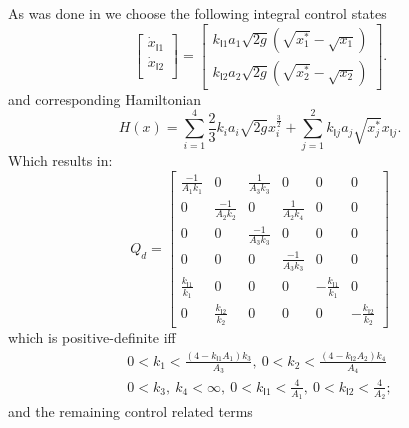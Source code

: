 As was done in \cite{johnsen07:_inter_and_dampin_assig_passiv} we
choose the following integral control states
\begin{equation}
\label{E:four_tank_I}
\begin{bmatrix}
\dot{x}_{\mathsf{I}1}\\
\dot{x}_{\mathsf{I}2}\\
\end{bmatrix} = 
\begin{bmatrix}
k_{\mathsf{I}1} a_1 \sqrt{2 g} \left ( \sqrt{x^*_1} -  \sqrt{x_1}
\right )\\
k_{\mathsf{I}2} a_2 \sqrt{2 g} \left ( \sqrt{x^*_2} -  \sqrt{x_2}
\right )
\end{bmatrix}.
\end{equation}
and corresponding Hamiltonian
\begin{equation}
\label{E:four_tank_ham}
H(x) = \sum_{i=1}^4 \frac{2}{3} k_i a_i \sqrt{2g} x_i^{\frac{3}{2}} +
\sum_{j=1}^2 k_{\mathsf{I}j} a_j \sqrt{x_j^*} x_{\mathsf{I}j}.
\end{equation}
Which results in:
\begin{equation*}
Q_d = \begin{bmatrix}
\frac{-1}{A_1k_1} & 0 & \frac{1}{A_3k_3} & 0 & 0 & 0\\
0 & \frac{-1}{A_2k_2} & 0 & \frac{1}{A_2k_4} & 0 & 0 \\
0 & 0 & \frac{-1}{A_3k_3} & 0  & 0 & 0 \\
0 & 0 & 0 & \frac{-1}{A_3k_3} & 0  & 0 \\
\frac{k_{\mathsf{I}1}}{k_1} & 0 & 0 & 0 & -\frac{k_{\mathsf{I}1}}{k_1}
& 0\\
0 & \frac{k_{\mathsf{I}2}}{k_2} & 0 & 0 & 0 & -\frac{k_{\mathsf{I}2}}{k_2}
\end{bmatrix}
\end{equation*}
which is positive-definite iff 
\begin{gather*}
0 < k_1< \frac{\left ( 4 - k_{\mathsf{I}1} A_1 \right )k_3}{A_3},\ 0 < k_2 < \frac{\left ( 4 - k_{\mathsf{I}2} A_2 \right )k_4}{A_4}\\
0 < k_3,\ k_4 < \infty,\ 0 < k_{\mathsf{I}1} < \frac{4}{A_1},\ 0 < k_{\mathsf{I}2} < \frac{4}{A_2};
\end{gather*}
and the remaining control related terms
